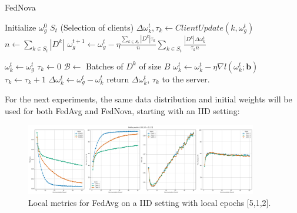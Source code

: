 \begin{algorithm}[H]
  \label{alg:FedNova}
  \caption{FedNova}
  \begin{algorithmic}[1]
    \Statex
    \State Initialize $\omega_g^0$
      \State $S_t$  (Selection of clients)
        \State $\Delta \omega_k^{t}, \tau_k \gets ClientUpdate(k, \omega_g^t)$
      \EndFor
      \State $n \gets \sum_{k \in S_t} |D^k|$
      \State $\omega_g^{t+1} \gets \omega_g^t - \eta \frac{\sum_{k \in S_t} |D^k| \tau_k}{n} \sum_{k \in S_t} \frac{|D^k| \Delta \omega_k^t}{\tau_k n}$
    \EndFor
    \EndProcedure

    \State $\omega_k^t \gets \omega_g^t$
    \State $\tau_k \gets 0$
    \State $\mathcal{B} \gets$ Batches of $D^k$ of size $B$
        \State $\omega_k^t \gets \omega_k^t - \eta \nabla l(\omega_k^t; \mathbf{b})$
        \State $\tau_k \gets \tau_k + 1$
      \EndFor
    \EndFor
    \State $\Delta \omega_k^t \gets \omega_g^t - \omega_k^t$
    \State return $\Delta \omega_k^t$, $\tau_k$  to the server.
    \EndProcedure
  \end{algorithmic}
\end{algorithm}

For the next experiments, the same data distribution and initial weights will be used for both FedAvg and FedNova, starting with an IID setting:


\begin{figure}[H]
  \centering
  \includegraphics[width=0.9\textwidth]{figures/2-Federated_Learning/FedAvg_IID_LE_512.png}
  \caption{Local metrics for FedAvg on a IID setting with local epochs [5,1,2].}
  \label{fig:FedAvg_IID_LE_512}
\end{figure}


